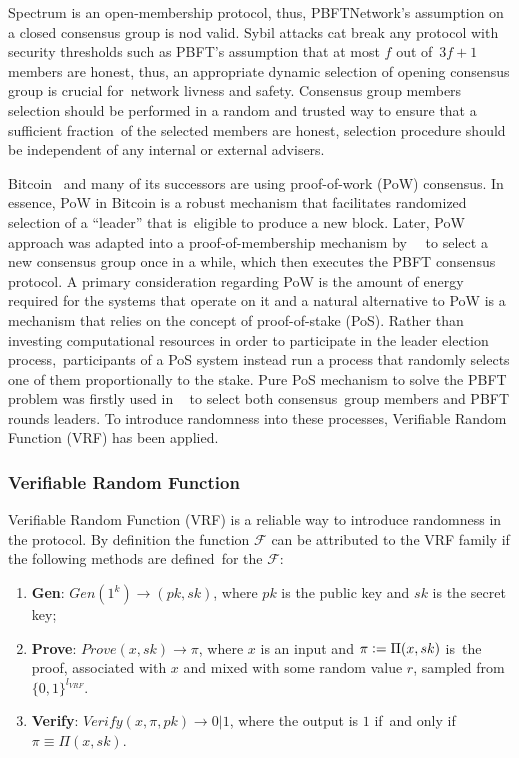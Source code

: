 Spectrum is an open-membership protocol, thus, PBFTNetwork's assumption on a closed consensus group is nod valid.
Sybil attacks cat break any protocol with security thresholds such as PBFT's assumption that at most $f$ out of\
${3 f + 1}$ members are honest, thus, an appropriate dynamic selection of opening consensus group is crucial for\
network livness and safety.
Consensus group members selection should be performed in a random and trusted way to ensure that a sufficient fraction\
of the selected members are honest, selection procedure should be independent of any internal or external advisers.

Bitcoin~\cite{nakamoto2009bitcoin} and many of its successors are using proof-of-work (PoW) consensus.
In essence, PoW in Bitcoin is a robust mechanism that facilitates randomized selection of a \enquote{leader} that is\
eligible to produce a new block.
Later, PoW approach was adapted into a proof-of-membership mechanism by ~\cite{kokoriskogias2016enhancing}\
to select a new consensus group once in a while, which then executes the PBFT consensus protocol.
A primary consideration regarding PoW is the amount of energy required for the systems that operate on it and
a natural alternative to PoW is a mechanism that relies on the concept of proof-of-stake (PoS).
Rather than investing computational resources in order to participate in the leader election process,\
participants of a PoS system instead run a process that randomly selects one of them proportionally to the stake.
Pure PoS mechanism to solve the PBFT problem was firstly used in ~\cite{cryptoeprint:2017/454} to select both consensus\
group members and PBFT rounds leaders.
To introduce randomness into these processes, Verifiable Random Function (VRF) has been applied.

\subsubsection{Verifiable Random Function}

Verifiable Random Function (VRF) is a reliable way to introduce randomness in the protocol.
By definition the function $\mathcal{F}$ can be attributed to the VRF family if the following methods are defined\
for the $\mathcal{F}$:
\begin{enumerate}
    \item \textbf{Gen}: ${Gen(1^k) \rightarrow (pk, sk)}$, where $pk$ is the public key and $sk$ is the secret key;
    \item \textbf{Prove}: ${Prove(x, sk) \rightarrow \pi}$, where $x$ is an input and $\pi \vcentcolon= \Pi(x, sk)$ is\
    the proof, associated with $x$ and mixed with some random value $r$, sampled from $\{0,1\}^{l_{VRF}}$.
    \item \textbf{Verify}: ${Verify(x, \pi, pk) \rightarrow 0 | 1}$, where the output is $1$ if\
    and only if ${\pi \equiv \Pi(x, sk)}$.
\end{enumerate}

